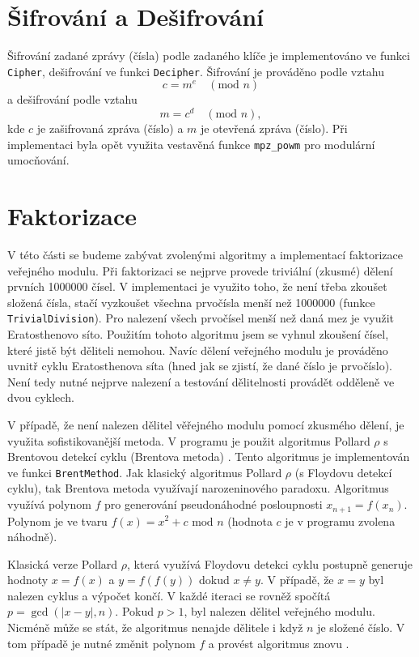 \documentclass[a4paper,12pt]{article}
\begin{document}
\section{Šifrování a Dešifrování}
Šifrování zadané zprávy (čísla) podle zadaného klíče je implementováno ve funkci \texttt{Cipher}, dešifrování
ve funkci \texttt{Decipher}.
Šifrování je prováděno podle vztahu \cite{nech}
$$
  c = m^e\quad (\mbox{mod } n)
$$
a dešifrování podle vztahu \cite{nech}
$$
  m = c^d\quad (\mbox{mod } n),
$$
kde $c$ je zašifrovaná zpráva (číslo) a $m$ je otevřená zpráva (číslo). Při implementaci
byla opět využita vestavěná funkce \texttt{mpz\_powm} pro modulární umocňování.

\section{Faktorizace}
V této části se budeme zabývat zvolenými algoritmy a implementací faktorizace veřejného 
modulu. Při faktorizaci se nejprve provede triviální (zkusmé) dělení prvních 1000000 čísel. V 
implementaci je využito toho, že není třeba zkoušet složená čísla, stačí vyzkoušet
všechna prvočísla menší než 1000000 (funkce \texttt{TrivialDivision}). Pro nalezení všech prvočísel menší než daná
mez je využit Eratosthenovo síto. Použitím tohoto algoritmu jsem se vyhnul zkoušení čísel,
které jistě být děliteli nemohou. Navíc dělení veřejného modulu je prováděno uvnitř cyklu
Eratosthenova síta (hned jak se zjistí, že dané číslo je prvočíslo). Není tedy
nutné nejprve nalezení a testování dělitelnosti provádět odděleně ve dvou cyklech.

V případě, že není nalezen dělitel věřejného modulu pomocí zkusmého dělení, je využita sofistikovanější metoda.
V programu je použit algoritmus Pollard $\rho$ s Brentovou detekcí cyklu (Brentova metoda) \cite{brent1}. Tento algoritmus
je implementován ve funkci \texttt{BrentMethod}.
Jak klasický algoritmus Pollard $\rho$ (s Floydovu detekcí cyklu), tak Brentova metoda využívají narozeninového paradoxu.
Algoritmus využívá
polynom $f$ pro generování pseudonáhodné posloupnosti $x_{n + 1} = f(x_n)$. Polynom je ve tvaru $f(x) = x^2 + c \mbox{ mod } n$
(hodnota $c$ je v programu zvolena náhodně).

Klasická verze Pollard $\rho$,
která využívá Floydovu detekci cyklu postupně generuje hodnoty $x = f(x)$ a $y = f(f(y))$ dokud $x\neq y$.
V případě, že $x = y$ byl nalezen cyklus a výpočet končí. V každé iteraci se rovněž spočítá $p = \gcd(|x - y|, n)$. 
Pokud $p > 1$, byl nalezen dělitel veřejného modulu. Nicméně může se stát, že algoritmus nenajde
dělitele i když $n$ je složené číslo. V tom případě je nutné změnit polynom $f$ a provést algoritmus znovu \cite{rho}.
\end{document}
